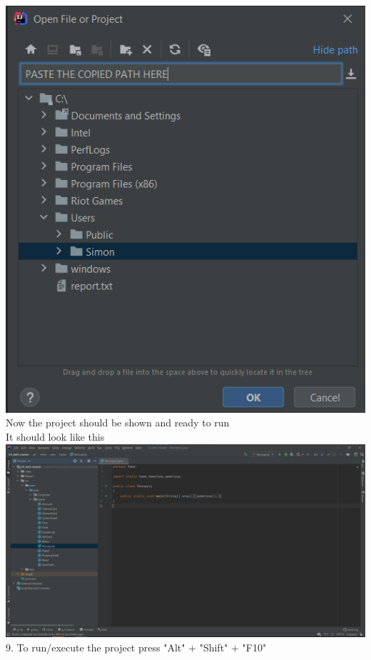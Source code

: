 \begin{flushleft}
    \includegraphics[width=16.5cm]{Report/root/step4.png}\\
    Now the project should be shown and ready to run\\
    \newpage
    It should look like this\\
    \vspace{5mm}
    \includegraphics[width=16.5cm]{Report/root/step5.1.png}\\
    9. To run/execute the project press "Alt" + "Shift" + "F10"

    
    
\end{flushleft}
